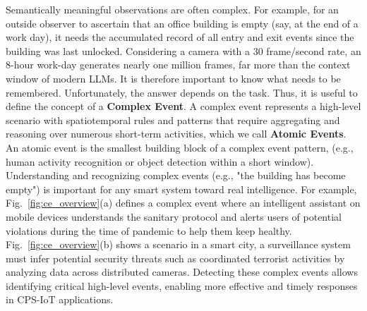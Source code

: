 Semantically meaningful observations are often complex. For example, for an outside observer to ascertain that an office building is empty (say, at the end of a work day), it needs the accumulated record of all entry and exit events since the building was last unlocked. Considering a camera with a 30 frame/second rate, an 8-hour work-day generates nearly one million frames, far more than the context window of modern LLMs. It is therefore important to know what needs to be remembered. Unfortunately, the answer depends on the task. Thus, it is useful to define the concept of a \textbf{Complex Event}. A complex event represents a high-level scenario with spatiotemporal rules and patterns that require aggregating and reasoning over numerous short-term activities, which we call \textbf{Atomic Events}. An atomic event is the smallest building block of a complex event pattern, (e.g., human activity recognition or object detection within a short window). Understanding and recognizing complex events (e.g., "the building has become empty") is important for any smart system toward real intelligence. For example, Fig.~\ref{fig:ce_overview}(a) defines a complex event where an intelligent assistant on mobile devices understands the sanitary protocol and alerts users of potential violations during the time of pandemic to help them keep healthy. Fig.~\ref{fig:ce_overview}(b) shows a scenario in a smart city, a surveillance system must infer potential security threats such as coordinated terrorist activities by analyzing data across distributed cameras. Detecting these complex events allows identifying critical high-level events, enabling more effective and timely responses in CPS-IoT applications.


